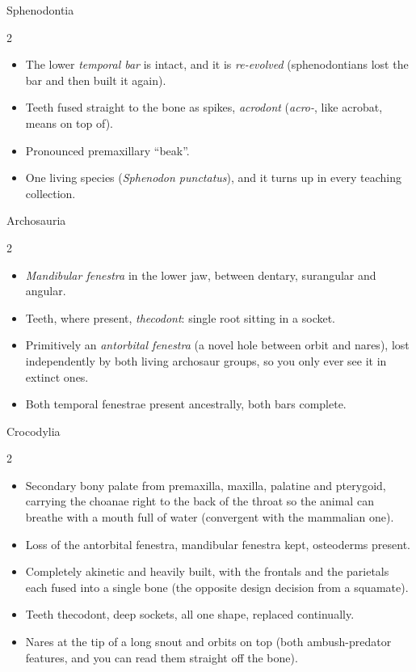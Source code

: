 \documentclass[11pt]{article}
\newcommand{\term}[1]{\textsl{#1}}
\begin{document}
\begin{cladebox}{Sphenodontia}
\begin{multicols}{2}
\begin{itemize}
\item The lower \term{temporal bar} is intact, and it is \emph{re-evolved}
  (sphenodontians lost the bar and then built it again).
\item Teeth fused straight to the bone as spikes, \term{acrodont} (\emph{acro-},
  like acrobat, means on top of).
\item Pronounced premaxillary ``beak''.
\item One living species (\emph{Sphenodon punctatus}), and it turns up in every
  teaching collection.
\end{itemize}
\end{multicols}
\end{cladebox}

\begin{cladebox}{Archosauria}
\begin{multicols}{2}
\begin{itemize}
\item \term{Mandibular fenestra} in the lower jaw, between dentary, surangular
  and angular.
\item Teeth, where present, \term{thecodont}: single root sitting in a socket.
\item Primitively an \term{antorbital fenestra} (a novel hole between orbit and
  nares), lost independently by both living archosaur groups, so you only ever
  see it in extinct ones.
\item Both temporal fenestrae present ancestrally, both bars complete.
\end{itemize}
\end{multicols}
\end{cladebox}

\begin{cladebox}{Crocodylia}
\begin{multicols}{2}
\begin{itemize}
\item Secondary bony palate from premaxilla, maxilla, palatine and pterygoid,
  carrying the choanae right to the back of the throat so the animal can breathe
  with a mouth full of water (convergent with the mammalian one).
\item Loss of the antorbital fenestra, mandibular fenestra kept, osteoderms
  present.
\item Completely akinetic and heavily built, with the frontals and the
  parietals each fused into a single bone (the opposite design decision from a
  squamate).
\item Teeth thecodont, deep sockets, all one shape, replaced continually.
\item Nares at the tip of a long snout and orbits on top (both ambush-predator
  features, and you can read them straight off the bone).
\end{itemize}
\end{multicols}
\end{cladebox}
\end{document}
